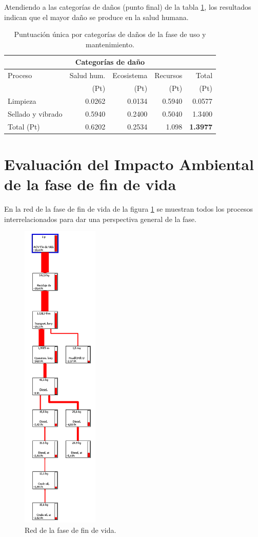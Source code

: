 Atendiendo a las categorías de daños (punto final) de la tabla \ref{categoriasdanosuso}, los resultados indican que el mayor daño se produce en la salud humana.

\begin{table}[!htb]
\centering
\begin{tabular}{p{6cm}rrrr}
\toprule
\multicolumn{5}{c}{Categorías de daño}\\
\midrule
Proceso & Salud hum. & Ecosistema & Recursos & Total\\
 & (Pt) & (Pt) &  (Pt) & (Pt)\\
\midrule
Limpieza & 0.0262 & 0.0134 & 0.5940 & 0.0577\\
Sellado y vibrado & 0.5940 & 0.2400 & 0.5040 & 1.3400\\
\midrule
Total (Pt) & 0.6202 & 0.2534 & 1.098 & \textbf{1.3977}\\
\bottomrule
\end{tabular}
\caption{Puntuación única por categorías de daños de la fase de uso y mantenimiento.}
\label{categoriasdanosuso}
\end{table}

\section{Evaluación del Impacto Ambiental de la fase de fin de vida}

En la red de la fase de fin de vida de la figura \ref{fig:fdv_red} se muestran todos los procesos interrelacionados para dar una perspectiva general de la fase.

\begin{figure}[!htb]
\centering
\includegraphics[height=15cm]{img/fdv_red.png}
\caption{Red de la fase de fin de vida.}
\label{fig:fdv_red}
\end{figure}


